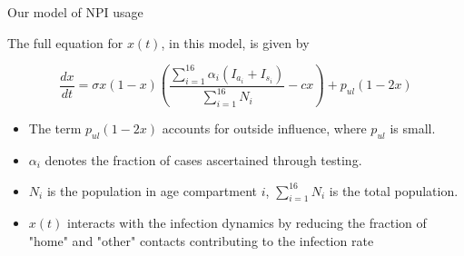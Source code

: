 \documentclass{beamer}
\begin{document}
\begin{frame}{Our model of NPI usage}

    The full equation for $x(t)$, in this model, is given by

    \begin{equation}{}
        \frac{d x}{dt} = \sigma x (1 - x) \left(\frac{\sum_{i=1}^{16}\alpha_i(I_{a_i} + I_{s_i})}{\sum_{i=1}^{16} N_i} - c x\right) + p_{ul}(1-2 x) 
    \end{equation}

    \begin{itemize}

    \item The term $p_{ul}(1-2 x)$ accounts for outside influence, where $p_{ul}$ is small.
    
    \item $\alpha_i$ denotes the fraction of cases ascertained through testing.
    
    \item $N_i$ is the population in age compartment $i$, $\sum_{i=1}^{16} N_i$ is the total population. 
    \item $x(t)$ interacts with the infection dynamics by reducing the fraction of "home" and "other" contacts contributing to the infection rate
    \end{itemize}

\end{frame}
\end{document}
